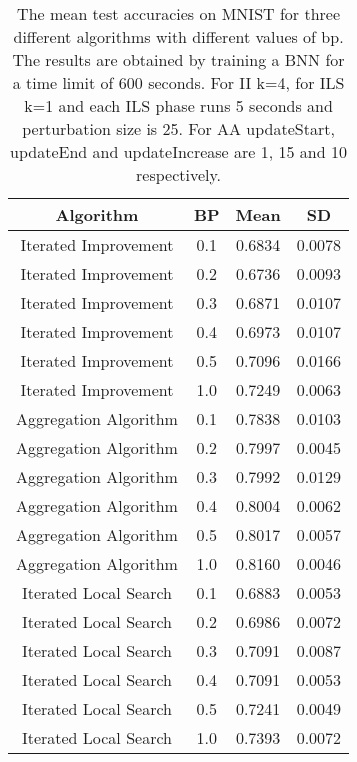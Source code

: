\begin{center}
\begin{table}[H]
\centering
\begin{tabular}{|c|c|c|c|}
  \hline
Algorithm & BP & Mean & SD \\ 
  \hline
Iterated Improvement & 0.1 & 0.6834 & 0.0078 \\ 
   \hline
Iterated Improvement & 0.2 & 0.6736 & 0.0093 \\ 
   \hline
Iterated Improvement & 0.3 & 0.6871 & 0.0107 \\ 
   \hline
Iterated Improvement & 0.4 & 0.6973 & 0.0107 \\ 
   \hline
Iterated Improvement & 0.5 & 0.7096 & 0.0166 \\ 
   \hline
Iterated Improvement & 1.0 & 0.7249 & 0.0063 \\ 
   \hline
Aggregation Algorithm & 0.1 & 0.7838 & 0.0103 \\ 
   \hline
Aggregation Algorithm & 0.2 & 0.7997 & 0.0045 \\ 
   \hline
Aggregation Algorithm & 0.3 & 0.7992 & 0.0129 \\ 
   \hline
Aggregation Algorithm & 0.4 & 0.8004 & 0.0062 \\ 
   \hline
Aggregation Algorithm & 0.5 & 0.8017 & 0.0057 \\ 
   \hline
Aggregation Algorithm & 1.0 & 0.8160 & 0.0046 \\ 
   \hline
Iterated Local Search & 0.1 & 0.6883 & 0.0053 \\ 
   \hline
Iterated Local Search & 0.2 & 0.6986 & 0.0072 \\ 
   \hline
Iterated Local Search & 0.3 & 0.7091 & 0.0087 \\ 
   \hline
Iterated Local Search & 0.4 & 0.7091 & 0.0053 \\ 
   \hline
Iterated Local Search & 0.5 & 0.7241 & 0.0049 \\ 
   \hline
Iterated Local Search & 1.0 & 0.7393 & 0.0072 \\ 
   \hline
\end{tabular}
\caption{The mean test accuracies on MNIST for three different algorithms with different values of bp.
            The results are obtained by training a BNN for a time limit of 600 seconds. For II k=4, for
            ILS k=1 and each ILS phase runs 5 seconds and perturbation size is 25. For AA updateStart, updateEnd
            and updateIncrease are 1, 15 and 10 respectively. } 
\label{MBT_FTBP}
\end{table}

\end{center}
